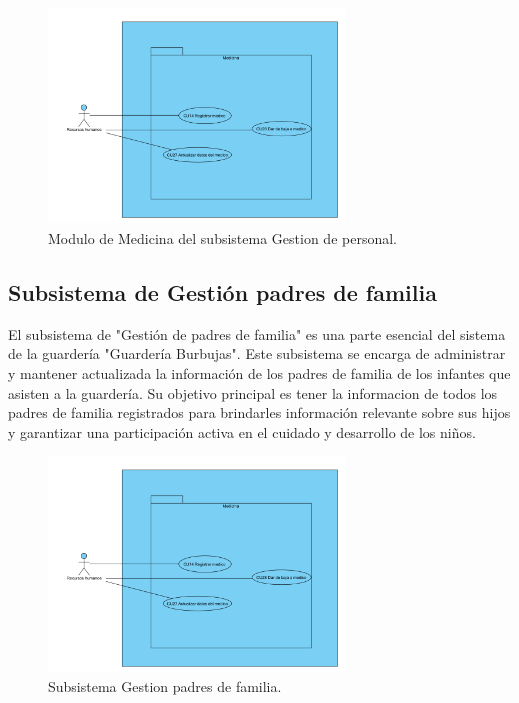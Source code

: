 \begin{figure}[htbp]
\centering
\includegraphics[width=0.7\textwidth]{images/arqui/subConsulMedicina.png}
\caption{Modulo de Medicina del subsistema Gestion de personal.}
\label{fig:subsistMedic}
\end{figure}

\clearpage
\subsection{Subsistema de Gestión padres de familia}
El subsistema de "Gestión de padres de familia" es una parte esencial del sistema de la guardería "Guardería Burbujas". Este subsistema se encarga de administrar y mantener actualizada la información de los padres de familia de los infantes que asisten a la guardería. Su objetivo principal es tener la informacion de todos los padres de familia registrados para brindarles información relevante sobre sus hijos y garantizar una participación activa en el cuidado y desarrollo de los niños.

\begin{figure}[htbp]
\centering
\includegraphics[width=0.7\textwidth]{images/arqui/subConsulMedicina.png}
\caption{Subsistema Gestion padres de familia.}
\label{fig:subsistGestionpapa}
\end{figure}
\clearpage
